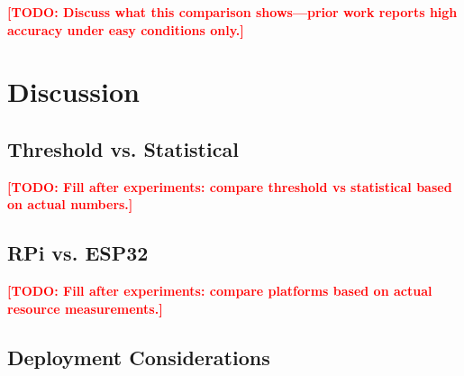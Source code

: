 \documentclass[conference]{IEEEtran}
\newcommand{\placeholder}[1]{\textcolor{red}{\textbf{[TODO: #1]}}}
\begin{document}
\placeholder{Discuss what this comparison shows---prior work reports high accuracy under easy conditions only.}

\section{Discussion}
\label{sec:discussion}

\subsection{Threshold vs. Statistical}


\placeholder{Fill after experiments: compare threshold vs statistical based on actual numbers.}

\subsection{RPi vs. ESP32}


\placeholder{Fill after experiments: compare platforms based on actual resource measurements.}

\subsection{Deployment Considerations}
\end{document}
